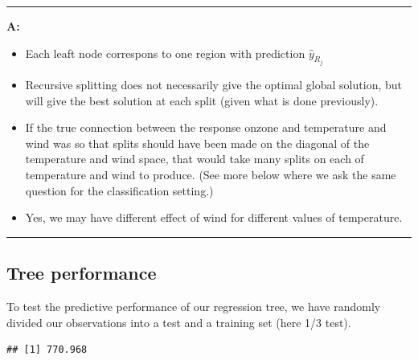 \documentclass[]{article}
\newenvironment{Shaded}{\begin{snugshade}}{\end{snugshade}}
\newcommand{\DataTypeTok}[1]{\textcolor[rgb]{0.13,0.29,0.53}{#1}}
\newcommand{\DecValTok}[1]{\textcolor[rgb]{0.00,0.00,0.81}{#1}}
\newcommand{\KeywordTok}[1]{\textcolor[rgb]{0.13,0.29,0.53}{\textbf{#1}}}
\newcommand{\NormalTok}[1]{#1}
\newcommand{\OperatorTok}[1]{\textcolor[rgb]{0.81,0.36,0.00}{\textbf{#1}}}
\newcommand{\StringTok}[1]{\textcolor[rgb]{0.31,0.60,0.02}{#1}}
\providecommand{\tightlist}{%
  \setlength{\itemsep}{0pt}\setlength{\parskip}{0pt}}
\begin{document}
\begin{center}\rule{0.5\linewidth}{\linethickness}\end{center}

\textbf{A:}

\begin{itemize}
\tightlist
\item
  Each leaft node correspons to one region with prediction
  \(\hat{y}_{R_j}\)
\item
  Recursive splitting does not necessarily give the optimal global
  solution, but will give the best solution at each split (given what is
  done previously).
\item
  If the true connection between the response onzone and temperature and
  wind was so that splits should have been made on the diagonal of the
  temperature and wind space, that would take many splits on each of
  temperature and wind to produce. (See more below where we ask the same
  question for the classification setting.)
\item
  Yes, we may have different effect of wind for different values of
  temperature.
\end{itemize}

\begin{center}\rule{0.5\linewidth}{\linethickness}\end{center}

\hypertarget{tree-performance}{%
\subsection{Tree performance}\label{tree-performance}}

To test the predictive performance of our regression tree, we have
randomly divided our observations into a test and a training set (here
1/3 test).

\begin{Shaded}
\end{Shaded}

\begin{verbatim}
## [1] 770.968
\end{verbatim}
\end{document}
